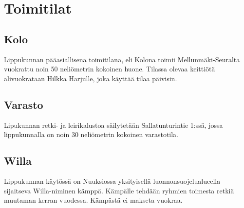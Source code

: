 \section{Toimitilat}
\subsection{Kolo}
Lippukunnan pääasiallisena toimitilana, eli Kolona toimii Mellunmäki-Seuralta vuokrattu noin 50 neliömetrin kokoinen huone. Tilassa olevaa keittiötä alivuokrataan Hilkka Harjulle, joka käyttää tilaa päivisin.
\subsection{Varasto}
Lipukunnan retki- ja leirikalustoa säilytetään Sallatunturintie 1:ssä, jossa lippukunnalla on noin 30 neliömetrin kokoinen varastotila. 
\subsection{Willa}
Lippukunnan käytössä on Nuuksiossa yksityisellä luonnonsuojelualueella sijaitseva Willa-niminen kämppä. Kämpälle tehdään ryhmien toimesta retkiä muutaman kerran vuodessa. Kämpästä ei makseta vuokraa.
\newpage

